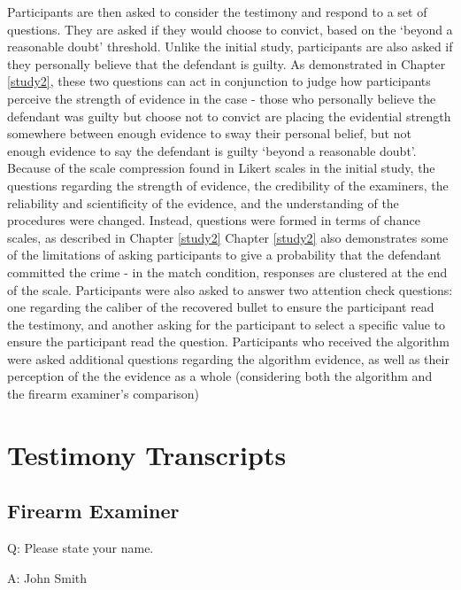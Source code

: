 \documentclass[print]{nuthesis}
\begin{document}
Participants are then asked to consider the testimony and respond to a set of questions.
They are asked if they would choose to convict, based on the `beyond a reasonable doubt' threshold.
Unlike the initial study, participants are also asked if they personally believe that the defendant is guilty.
As demonstrated in Chapter \ref{study2}, these two questions can act in conjunction to judge how participants perceive the strength of evidence in the case - those who personally believe the defendant was guilty but choose not to convict are placing the evidential strength somewhere between enough evidence to sway their personal belief, but not enough evidence to say the defendant is guilty `beyond a reasonable doubt'.
Because of the scale compression found in Likert scales in the initial study, the questions regarding the strength of evidence, the credibility of the examiners, the reliability and scientificity of the evidence, and the understanding of the procedures were changed.
Instead, questions were formed in terms of chance scales, as described in Chapter \ref{study2}
Chapter \ref{study2} also demonstrates some of the limitations of asking participants to give a probability that the defendant committed the crime - in the match condition, responses are clustered at the end of the scale.
Participants were also asked to answer two attention check questions: one regarding the caliber of the recovered bullet to ensure the participant read the testimony, and another asking for the participant to select a specific value to ensure the participant read the question.
Participants who received the algorithm were asked additional questions regarding the algorithm evidence, as well as their perception of the the evidence as a whole (considering both the algorithm and the firearm examiner's comparison)

\appendix

\hypertarget{testimony-transcripts}{%
\chapter{Testimony Transcripts}\label{testimony-transcripts}}

\hypertarget{firearm-examiner}{%
\section{Firearm Examiner}\label{firearm-examiner}}

Q: Please state your name.

A: John Smith
\end{document}
